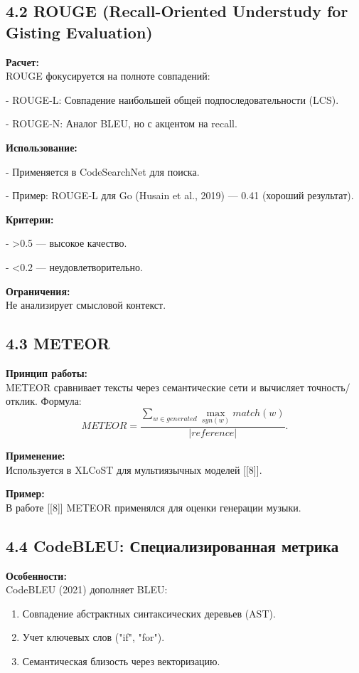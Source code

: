 \subsection*{4.2 ROUGE (Recall-Oriented Understudy for Gisting Evaluation)}

\textbf{Расчет:} \\
ROUGE фокусируется на полноте совпадений:

    
- ROUGE-L: Совпадение наибольшей общей подпоследовательности (LCS).
    
- ROUGE-N: Аналог BLEU, но с акцентом на recall.


\textbf{Использование:}

    
- Применяется в CodeSearchNet для поиска.
    
- Пример: ROUGE-L для Go (Husain et al., 2019) — 0.41 (хороший результат).


\textbf{Критерии:}

    
- >0.5 — высокое качество.
    
- <0.2 — неудовлетворительно.


\textbf{Ограничения:} \\
Не анализирует смысловой контекст.

\subsection*{4.3 METEOR}

\textbf{Принцип работы:} \\
METEOR сравнивает тексты через семантические сети и вычисляет точность/отклик. Формула:
\[
METEOR = \frac{\sum_{w \in generated} \max_{syn(w)} match(w)}{|reference|}.
\]

\textbf{Применение:} \\
Используется в XLCoST для мультиязычных моделей [[8]].

\textbf{Пример:} \\
В работе [[8]] METEOR применялся для оценки генерации музыки.

\subsection*{4.4 CodeBLEU: Специализированная метрика}

\textbf{Особенности:} \\
CodeBLEU (2021) дополняет BLEU:
\begin{enumerate}
    \item Совпадение абстрактных синтаксических деревьев (AST).
    \item Учет ключевых слов ("if", "for").
    \item Семантическая близость через векторизацию.
\end{enumerate}

